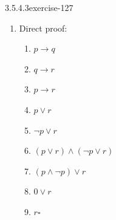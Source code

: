 \documentclass[twoside,10pt,]{book}
\numberwithin{equation}{section}
\begin{document}
\begin{divisionsolution}{3.5.4.3}{}{exercise-127}
\begin{enumerate}[label=(\alph*)]
\begin{enumerate}[label=(\arabic*)]
\(s\quad\) Conjunctive simplification (3)%
\item\hypertarget{li-667}{}\hypertarget{p-1188}{}%
\(\neg s\lor p\quad \)   Premise%
\item\hypertarget{li-668}{}\hypertarget{p-1189}{}%
\(s\to p\quad\)   Conditional equivalence (5)%
\item\hypertarget{li-669}{}\hypertarget{p-1190}{}%
\(p  \quad\)  Detachment (4), (6)%
\item\hypertarget{li-670}{}\hypertarget{p-1191}{}%
\(p\to (q\to r)\quad\)   Premise%
\item\hypertarget{li-671}{}\hypertarget{p-1192}{}%
\(q\to r \quad\)  Detachment (7), (8)%
\item\hypertarget{li-672}{}\hypertarget{p-1193}{}%
\(q\quad \)   Premise%
\item\hypertarget{li-673}{}\hypertarget{p-1194}{}%
\(r\quad\)   Detachment (9), (10)%
\item\hypertarget{li-674}{}\hypertarget{p-1195}{}%
\(\neg r \quad\) Conjunctive simplification (3)%
\item\hypertarget{li-675}{}\hypertarget{p-1196}{}%
\(0\)  \textbackslash{}quad Conjunction (11), (12) \(\square\)%
\end{enumerate}
%
\item\hypertarget{li-676}{}\hypertarget{p-1197}{}%
Direct proof:%
\par
\hypertarget{p-1198}{}%
%
\begin{enumerate}[label=(\arabic*)]
\item\hypertarget{li-677}{}\hypertarget{p-1199}{}%
\(p\to q\)%
\item\hypertarget{li-678}{}\hypertarget{p-1200}{}%
\(q\to r\)%
\item\hypertarget{li-679}{}\hypertarget{p-1201}{}%
\(p\to r\)%
\item\hypertarget{li-680}{}\hypertarget{p-1202}{}%
\(p\lor r\)%
\item\hypertarget{li-681}{}\hypertarget{p-1203}{}%
\(\neg p\lor r\)%
\item\hypertarget{li-682}{}\hypertarget{p-1204}{}%
\((p\lor r)\land (\neg p\lor r)\)%
\item\hypertarget{li-683}{}\hypertarget{p-1205}{}%
\((p\land \neg p)\lor r\)%
\item\hypertarget{li-684}{}\hypertarget{p-1206}{}%
\(0\lor r\)%
\item\hypertarget{li-685}{}\hypertarget{p-1207}{}%
\(r\)\(\square\)%
\end{enumerate}
%
\par

\end{enumerate}
\end{divisionsolution}
\end{document}
